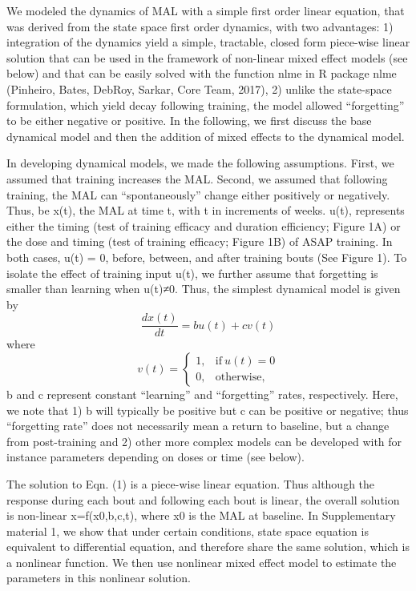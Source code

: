 We modeled the dynamics of MAL with a simple first order linear equation, that was derived from the state space first order dynamics, with two advantages: 1) integration of the dynamics yield a simple, tractable, closed form piece-wise linear solution that can be used in the framework of non-linear mixed effect models (see below) and that can be easily solved with the function nlme in R package nlme (Pinheiro, Bates, DebRoy, Sarkar,  Core Team, 2017), 2) unlike the state-space formulation, which yield decay following training, the model allowed “forgetting” to be either negative or positive. 
In the following, we first discuss the base dynamical model and then the addition of mixed effects to the dynamical model.

In developing dynamical models, we made the following assumptions. 
First, we assumed that training increases the MAL. 
Second, we assumed that following training, the MAL can “spontaneously” change either positively or negatively. 
Thus, be x(t), the MAL at time t, with t in increments of weeks. 
u(t), represents either the timing (test of training efficacy and duration efficiency; Figure 1A) or the dose and timing (test of training efficacy; Figure 1B) of  ASAP training. 
In both cases, u(t) = 0, before, between, and after training bouts (See Figure 1). 
To isolate the effect of training input u(t), we further assume that forgetting is smaller than learning when u(t)≠0. 
Thus, the simplest dynamical model is given by
\begin{equation}\label{fode}
	\frac{dx(t)}{dt} = bu(t) + cv(t)
\end{equation}
where
\begin{equation}
v(t) = 
\begin{cases}
	1, & \text{if}\ u(t) = 0 \\
	0, & \text{otherwise},
\end{cases}
\end{equation}
b and c represent constant “learning” and “forgetting” rates, respectively. 
Here, we note that 1) b will typically be positive but c can be positive or negative; thus “forgetting rate” does not necessarily mean a return to baseline, but a change from post-training and 2) other more complex models can be developed with for instance parameters depending on doses or time (see below). 

The solution to Eqn. (1) is a piece-wise linear equation. 
Thus although the response during each bout and following each bout is linear, the overall solution is non-linear
x=f(x0,b,c,t), where x0 is the MAL at baseline. 
In Supplementary material 1, we show that under certain conditions, state space equation is equivalent to differential equation, and therefore share the same solution, which is a nonlinear function. 
We then use nonlinear mixed effect model to estimate the parameters in this nonlinear solution.

